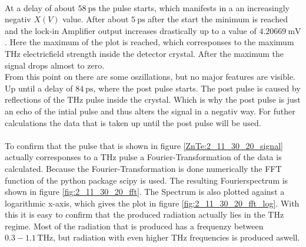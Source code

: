 \\
At a delay of about $\SI{58}{\pico\second}$ the pulse starts, which manifests in a an increasingly negativ $X(V)$ value.
After about $\SI{5}{\pico\second}$ after the start the minimum is reached and the lock-in Amplifier output increases drastically up to a value of $\SI{4.20669}{\milli\V}$.
Here the maximum of the plot is reached, which corresponses to the maximum $\si{\tera\hertz}$ electricfield strength inside the detector crystal.
After the maximum the signal drops almost to zero.
\\
From this point on there are some oszillations, but no major features are visible. %
Up until a delay of $\SI{84}{\pico\second}$, where the post pulse starts.
The post pulse is caused by reflections of the $\si{\tera\hertz}$ pulse inside the crystal.
Which is why the post pulse is just an echo of the intial pulse and thus alters the signal in a negativ way.
For futher calculations the data that is taken up until the post pulse will be used.
\\\\
\FloatBarrier
To confirm that the pulse that is shown in figure \ref{ZnTe:2_11_30_20_signal} actually corresponses to a $\si{\tera\hertz}$ pulse a Fourier-Transformation of the data is calculated. %
Because the Fourier-Transformation is done numerically the FFT function of the python package scipy \cite{scipy} is used.
The resulting Fourierspectrum is shown in figure \ref{fig:2_11_30_20_fft}.
The Spectrum is also plotted against a logarithmic x-axis, which gives the plot in figure \ref{fig:2_11_30_20_fft_log}.
With this it is easy to confirm that the produced radiation actually lies in the $\si{\tera\hertz}$ regime.
Most of the radiation that is produced has a frequenzy between $0.3-1.1\,\si{\tera\hertz}$, but radiation with even higher $\si{\tera\hertz}$ frequencies is produced aswell.
